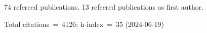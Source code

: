 74 refereed publications. 13 refeered publications as first author.

Total citations~=~4126; h-index~=~35 (2024-06-19)